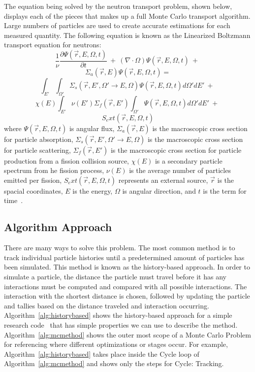 %
The equation being solved by the neutron transport problem, shown below, displays each of the pieces that makes up a full Monte Carlo transport algorithm.
%
Large numbers of particles are used to create accurate estimations for each measured quantity.
%
The following equation is known as the Linearized Boltzmann transport equation for neutrons:
%
$$
\frac{1}{\nu} \frac{ \partial \Psi ( \vec{r}, E, \Omega, t ) }{\partial t}\ +\ 
(\nabla \cdot \Omega ) \Psi ( \vec{r}, E, \Omega, t )\ +\
$$
$$ 
\Sigma_a (\vec{r}, E ) \Psi ( \vec{r}, E, \Omega, t ) =$$
$$
\int _{E '} \int _{\Omega '} \Sigma_{s} ( \vec{r}, E', \Omega ' \rightarrow E, \Omega ) \Psi (\vec{r}, E, \Omega, t) d \Omega ' dE'\ +\ 
$$
$$
\chi (E) \int _{E'} \nu (E') \Sigma_{f} (\vec{r},E') \int _{\Omega '} \Psi ( \vec{r}, E, \Omega, t ) d \Omega ' dE'\ +\ $$
$$
S_ext(\vec{r}, E, \Omega, t )
$$
%
where $ \Psi ( \vec{r}, E, \Omega, t ) $ is angular flux, 
$\Sigma_a (\vec{r}, E )$ is the macroscopic cross section for particle absorption, 
$\Sigma_{s} ( \vec{r}, E', \Omega ' \rightarrow E, \Omega )$ is the macroscopic cross section for particle scattering,
$\Sigma_{f} (\vec{r},E') $ is the macroscopic cross section for particle production from a fission collision source,
$\chi (E)$ is a secondary particle spectrum from he fission process,
$\nu (E)$ is the average number of particles emitted per fission,
$S_ext(\vec{r}, E, \Omega, t )$ represents an external source,
$\vec{r}$ is the spacial coordinates,
$E$ is the energy,
$\Omega$ is angular direction,
and $t$ is the term for time~\cite{gentileMCPTAPO}.
%

\subsection{ \textbf{ Algorithm Approach} }

There are many ways to solve this problem.
%
The most common method is to track individual particle histories until a predetermined amount of particles has been simulated.
%
This method is known as the history-based approach.
%
In order to simulate a particle, the distance the particle must travel before it has any interactions must be computed and compared with all possible interactions.
%
The interaction with the shortest distance is chosen, followed by updating the particle and tallies based on the distance traveled and interaction occurring.
% 
Algorithm~\ref{alg:historybased} shows the history-based approach for a simple research code~\cite{alpsmc1} that has simple properties we can use to describe the method.
%
Algorithm~\ref{alg:mcmethod} shows the outer most scope of a Monte Carlo Problem for referencing where different optimizations or stages occur.
%
For example, Algorithm~\ref{alg:historybased} takes place inside the Cycle loop of Algorithm~\ref{alg:mcmethod} and shows only the steps for Cycle: Tracking.


